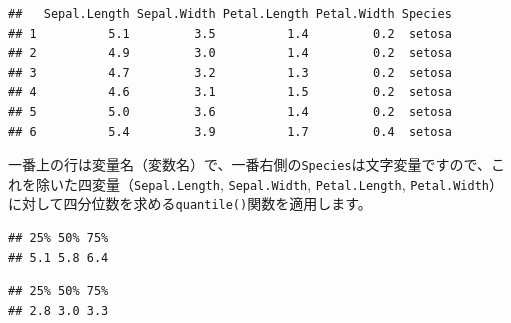 \documentclass[
  12pt,
]{book}
\newenvironment{Shaded}{\begin{snugshade}}{\end{snugshade}}
\newcommand{\AttributeTok}[1]{\textcolor[rgb]{0.77,0.63,0.00}{#1}}
\newcommand{\FloatTok}[1]{\textcolor[rgb]{0.00,0.00,0.81}{#1}}
\newcommand{\FunctionTok}[1]{\textcolor[rgb]{0.00,0.00,0.00}{#1}}
\newcommand{\NormalTok}[1]{#1}
\newcommand{\SpecialCharTok}[1]{\textcolor[rgb]{0.00,0.00,0.00}{#1}}
\begin{document}
\begin{verbatim}
##   Sepal.Length Sepal.Width Petal.Length Petal.Width Species
## 1          5.1         3.5          1.4         0.2  setosa
## 2          4.9         3.0          1.4         0.2  setosa
## 3          4.7         3.2          1.3         0.2  setosa
## 4          4.6         3.1          1.5         0.2  setosa
## 5          5.0         3.6          1.4         0.2  setosa
## 6          5.4         3.9          1.7         0.4  setosa
\end{verbatim}

一番上の行は変量名（変数名）で、一番右側の\texttt{Species}は文字変量ですので、これを除いた四変量（\texttt{Sepal.Length}, \texttt{Sepal.Width}, \texttt{Petal.Length}, \texttt{Petal.Width}）に対して四分位数を求める\texttt{quantile()}関数を適用します。

\begin{Shaded}
\end{Shaded}

\begin{verbatim}
## 25% 50% 75% 
## 5.1 5.8 6.4
\end{verbatim}

\begin{Shaded}
\end{Shaded}

\begin{verbatim}
## 25% 50% 75% 
## 2.8 3.0 3.3
\end{verbatim}

\begin{Shaded}
\end{Shaded}
\end{document}
